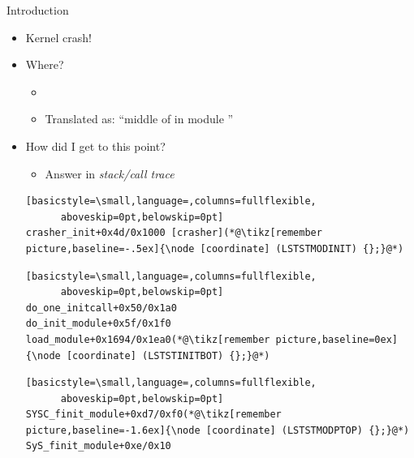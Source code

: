 \begin{frame}[fragile]{Introduction}

  \begin{itemize}
    \item Kernel crash!

    \pause

    \item Where?
    \begin{itemize}
      \item {}

      \pause

      \item Translated as: ``middle of  in module
	''
    \end{itemize}

    \pause

    \item How did I get to this point?

    \pause

    \begin{itemize}
      \item Answer in \emph{stack/call trace}
    \end{itemize}

    \begin{lstlisting}[basicstyle=\small,language=,columns=fullflexible,
      aboveskip=0pt,belowskip=0pt]
crasher_init+0x4d/0x1000 [crasher](*@\tikz[remember picture,baseline=-.5ex]{\node [coordinate] (LSTSTMODINIT) {};}@*)
    \end{lstlisting}


    \begin{lstlisting}[basicstyle=\small,language=,columns=fullflexible,
      aboveskip=0pt,belowskip=0pt]
do_one_initcall+0x50/0x1a0
do_init_module+0x5f/0x1f0
load_module+0x1694/0x1ea0(*@\tikz[remember picture,baseline=0ex]{\node [coordinate] (LSTSTINITBOT) {};}@*)
    \end{lstlisting}


    \begin{lstlisting}[basicstyle=\small,language=,columns=fullflexible,
      aboveskip=0pt,belowskip=0pt]
SYSC_finit_module+0xd7/0xf0(*@\tikz[remember picture,baseline=-1.6ex]{\node [coordinate] (LSTSTMODPTOP) {};}@*)
SyS_finit_module+0xe/0x10
    \end{lstlisting}


\end{itemize}
\end{frame}

